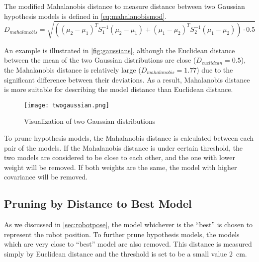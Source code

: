 The modified Mahalanobis distance to measure distance between two Gaussian hypothesis models is defined in \autoref{eq:mahalanobismod}.
\begin{equation}
\label{eq:mahalanobismod}
D_{mahalanobis} = \sqrt{((\mu_2 - \mu_1)^T S_1^{-1} (\mu_2-\mu_1) + (\mu_1 - \mu_2)^T S_2^{-1} (\mu_1-\mu_2)) \cdot 0.5}
\end{equation}

An example is illustrated in \autoref{fig:gaussians}, although the Euclidean distance between the mean of the two Gaussian distributions are close ($D_{euclidean}=0.5$), the Mahalanobis distance is relatively large ($D_{mahalanobis}=1.77$) due to the significant difference between their deviations. As a result, Mahalanobis distance is more suitable for describing the model distance than Euclidean distance.

\begin{figure}[tbh]
\begin{center}
	\texttt{[image: twogaussian.png]}
\end{center}
\caption{Visualization of two Gaussian distributions}
\label{fig:gaussians}
\end{figure}

To prune hypothesis models, the Mahalanobis distance is calculated between each pair of the models. If the Mahalanobis distance is under certain threshold, the two models are considered to be close to each other, and the one with lower weight will be removed. If both weights are the same, the model with higher covariance will be removed.


\subsection{Pruning by Distance to Best Model}
\label{sub:Pruning by Distance to Best Model}

As we discussed in \autoref{sec:robotpose}, the model whichever is the ``best'' is chosen to represent the robot position. To further prune hypothesis models, the models which are very close to ``best'' model are also removed. This distance is measured simply by Euclidean distance and the threshold is set to be a small value \SI{2}{\cm}.

